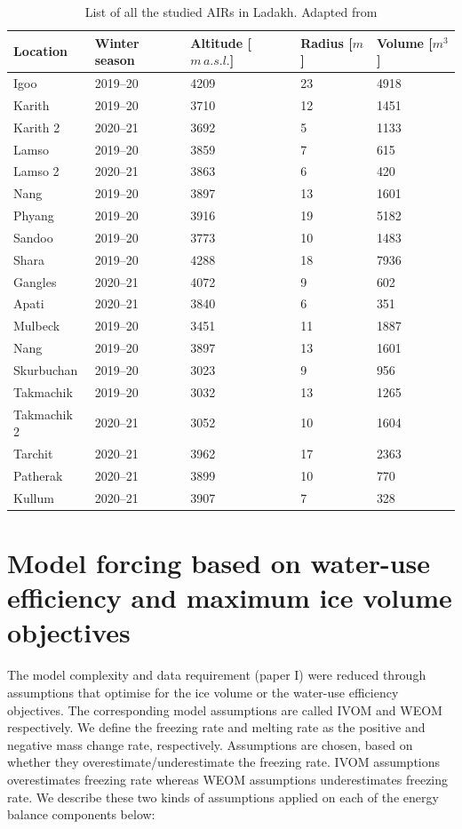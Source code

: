 \begin{table}[htb]
  \centering
  \caption{List of all the studied AIRs in Ladakh. Adapted from \citet{mariagruberIceStupasLadakh2022}}
	\label{tab:Ladakh_AIRs}
	\begin{tabular}{|lllll|}
    \hline
    \textbf{Location}     & \textbf{Winter season} & \textbf{Altitude [$m\,a.s.l.$]} & \textbf{
    Radius [$m$]} & \textbf{Volume [$m^3$]} \\ \hline
    Igoo & 2019--20 & 4209 & 23 & 4918  \\
    Karith & 2019--20 & 3710 & 12 & 1451  \\
    Karith 2 & 2020--21 & 3692 & 5 & 1133  \\
    Lamso & 2019--20 & 3859 & 7 & 615  \\
    Lamso 2& 2020--21 & 3863 & 6 & 420  \\
    Nang& 2019--20 & 3897 & 13 & 1601 \\
    Phyang& 2019--20 & 3916 & 19 & 5182 \\
    Sandoo& 2019--20 & 3773 & 10 & 1483 \\
    Shara& 2019--20 & 4288 & 18 & 7936 \\
    Gangles& 2020--21 & 4072 & 9 & 602 \\
    Apati& 2020--21 & 3840 & 6 & 351 \\
    Mulbeck& 2019--20 & 3451 & 11 & 1887\\
    Nang& 2019--20 & 3897 & 13 & 1601\\
    Skurbuchan& 2019--20 & 3023 & 9 & 956\\
    Takmachik& 2019--20 & 3032 & 13 &1265\\
    Takmachik 2& 2020--21 & 3052 & 10 &1604\\
    Tarchit& 2020--21 & 3962 & 17 &2363\\
    Patherak& 2020--21 & 3899 & 10 &770\\
    Kullum& 2020--21 & 3907 & 7 &328\\ \hline
	\end{tabular}
\end{table}

\section{Model forcing based on water-use efficiency and maximum ice volume objectives}
\label{sec:auto_software}

The model complexity and data requirement (paper I) were reduced through assumptions that optimise for the ice
volume or the water-use efficiency objectives. The corresponding model assumptions are called IVOM and WEOM
respectively. We define the freezing rate and melting rate as the positive and negative mass change rate,
respectively. Assumptions are chosen, based on whether they overestimate/underestimate the freezing rate. IVOM
assumptions overestimates freezing rate whereas WEOM assumptions underestimates freezing rate. We describe these
two kinds of assumptions applied on each of the energy balance components below: 

